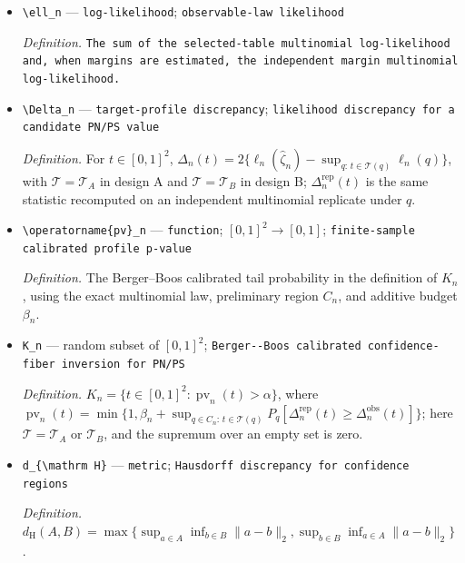 \documentclass{article}
\begin{document}
\begin{itemize}
  \item \texttt{\textbackslash{}\allowbreak{}ell\_\allowbreak{}n} --- \texttt{log-\allowbreak{}likelihood}; \texttt{observable-\allowbreak{}law likelihood}
  \par\smallskip\noindent\emph{Definition.} \texttt{The sum of the selected-\allowbreak{}table multinomial log-\allowbreak{}likelihood and,\allowbreak{} when margins are estimated,\allowbreak{} the independent margin multinomial log-\allowbreak{}likelihood.}
  \item \texttt{\textbackslash{}\allowbreak{}Delta\_\allowbreak{}n} --- \texttt{target-\allowbreak{}profile discrepancy}; \texttt{likelihood discrepancy for a candidate PN/\allowbreak{}PS value}
  \par\smallskip\noindent\emph{Definition.} For \(t\in[0,1]^2\), \(\Delta_n(t)=2\{\ell_n(\widehat\zeta_n)-\sup_{q:\,t\in\mathcal T(q)}\ell_n(q)\}\), with \(\mathcal T=\mathcal T_A\) in design A and \(\mathcal T=\mathcal T_B\) in design B; \(\Delta_n^{\mathrm{rep}}(t)\) is the same statistic recomputed on an independent multinomial replicate under \(q\).
  \item \texttt{\textbackslash{}\allowbreak{}operatorname\{pv\}\allowbreak{}\_\allowbreak{}n} --- \texttt{function}; \([0,1]^2\to[0,1]\); \texttt{finite-\allowbreak{}sample calibrated profile p-\allowbreak{}value}
  \par\smallskip\noindent\emph{Definition.} The Berger--Boos calibrated tail probability in the definition of \(K_n\), using the exact multinomial law, preliminary region \(C_n\), and additive budget \(\beta_n\).
  \item \texttt{K\_\allowbreak{}n} --- random subset of \([0,1]^2\); \texttt{Berger-\allowbreak{}-\allowbreak{}Boos calibrated confidence-\allowbreak{}fiber inversion for PN/\allowbreak{}PS}
  \par\smallskip\noindent\emph{Definition.} \(K_n=\{t\in[0,1]^2:\operatorname{pv}_n(t)>\alpha\}\), where \(\operatorname{pv}_n(t)=\min\{1,\beta_n+\sup_{q\in C_n:\,t\in\mathcal T(q)}P_q[\Delta_n^{\mathrm{rep}}(t)\ge\Delta_n^{\mathrm{obs}}(t)]\}\); here \(\mathcal T=\mathcal T_A\) or \(\mathcal T_B\), and the supremum over an empty set is zero.
  \item \texttt{d\_\allowbreak{}\{\textbackslash{}\allowbreak{}mathrm H\}\allowbreak{}} --- \texttt{metric}; \texttt{Hausdorff discrepancy for confidence regions}
  \par\smallskip\noindent\emph{Definition.} \(d_{\mathrm H}(A,B)=\max\{\sup_{a\in A}\inf_{b\in B}\|a-b\|_2,\sup_{b\in B}\inf_{a\in A}\|a-b\|_2\}\).

\end{itemize}
\end{document}
